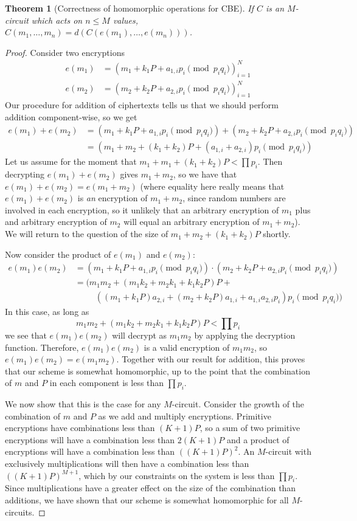 \documentclass[11pt]{report}
\newtheorem{thm}{Theorem}
\begin{document}
\begin{thm}[Correctness of homomorphic operations for CBE]
If $C$ is an $M$-circuit which acts on $n\leq M$ values, $C(m_1,\dots,m_n) = d(C(e(m_1),\dots,e(m_n)))$.
\end{thm}

\begin{proof}
Consider two encryptions
\begin{align*}
e(m_1) &= (m_1+ k_1P+a_{1,i}p_i \pmod{p_iq_i})_{i=1}^N\\
e(m_2) &= (m_2+ k_2P+a_{2,i}p_i \pmod{p_iq_i})_{i=1}^N
\end{align*}
Our procedure for addition of ciphertexts tells us that we should perform addition component-wise, so we get
\begin{align*}
e(m_1)+e(m_2) &= (m_1+k_1P+a_{1,i}p_i \pmod{p_iq_i}) + (m_2+ k_2P+a_{2,i}p_i \pmod{p_iq_i}) \\
\ &= (m_1+m_2+ (k_1+k_2)P+(a_{1,i}+a_{2,i})p_i \pmod{p_iq_i})
\end{align*}
Let us assume for the moment that $m_1+m_1+(k_1+k_2)P < \prod p_i$. Then decrypting $e(m_1)+e(m_2)$ gives $m_1+m_2$, so we have that $e(m_1)+e(m_2) = e(m_1+m_2)$ (where equality here really means that $e(m_1)+e(m_2)$ is \emph{an} encryption of $m_1+m_2$, since random numbers are involved in each encryption, so it unlikely that an arbitrary encryption of $m_1$ plus and arbitrary encryption of $m_2$ will equal an arbitrary encryption of $m_1+m_2$). We will return to the question of the size of $m_1+m_2+(k_1+k_2)P$ shortly.

Now consider the product of $e(m_1)$ and $e(m_2)$:
\begin{align*}
e(m_1) e(m_2) &= (m_1+ k_1P+a_{1,i}p_i \pmod{p_iq_i}) \cdot (m_2+ k_2P+a_{2,i}p_i \pmod{p_iq_i}) \\
\ &= (m_1m_2+ (m_1k_2+m_2k_1+k_1k_2P)P+\\
& \ \ \ \ \ \ \ \ \ \ \ ((m_1+k_1P)a_{2,i}+(m_2+k_2P)a_{1,i}+a_{1,i}a_{2,i}p_i)p_i \pmod{p_iq_i})
\end{align*}
In this case, as long as
\[m_1m_2+ (m_1k_2+m_2k_1+k_1k_2P)P < \prod p_i\]
we see that $e(m_1)e(m_2)$ will decrypt as $m_1m_2$ by applying the decryption function. Therefore, $e(m_1)e(m_2)$ is a valid encryption of $m_1m_2$, so $e(m_1)e(m_2) = e(m_1m_2)$. Together with our result for addition, this proves that our scheme is somewhat homomorphic, up to the point that the combination of $m$ and $P$ in each component is less than $\prod p_i$.

We now show that this is the case for any $M$-circuit. Consider the growth of the combination of $m$ and $P$ as we add and multiply encryptions. Primitive encryptions have combinations less than $(K+1)P$, so a sum of two primitive encryptions will have a combination less than $2(K+1)P$ and a product of encryptions will have a combination less than $((K+1)P)^2$. An $M$-circuit with exclusively multiplications will then have a combination less than $((K+1)P)^{M+1}$, which by our constraints on the system is less than $\prod p_i$. Since multiplications have a greater effect on the size of the combination than additions, we have shown that our scheme is somewhat homomorphic for all $M$-circuits.


\end{proof}
\end{document}
